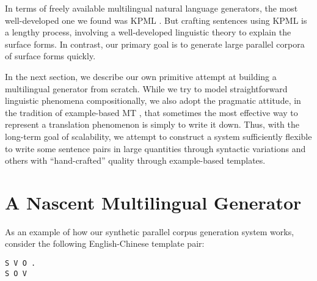 % 

In terms of freely available multilingual natural language generators, the most well-developed one we found was KPML .
But crafting sentences using KPML is a lengthy process, involving a well-developed linguistic theory to explain the surface forms.
In contrast, our primary goal is to generate large parallel corpora of surface forms quickly. 

In the next section, we describe our own primitive attempt at building a multilingual generator from scratch. 
While we try to model straightforward linguistic phenomena compositionally, we also adopt the pragmatic attitude, in the tradition of example-based MT , that sometimes the most effective way to represent a translation phenomenon is simply to write it down.
Thus, with the long-term goal of scalability, we attempt to construct a system sufficiently flexible to write some sentence pairs in large quantities through syntactic variations and others with ``hand-crafted'' quality through example-based templates.


\section{A Nascent Multilingual Generator}
\label{sec:generator}


As an example of how our synthetic parallel corpus generation system works, consider the following English-Chinese template pair:

\begin{center} \begin{small} 
{\tt S V O .} \\
{\tt S  O V }
\end{small} \end{center} 

